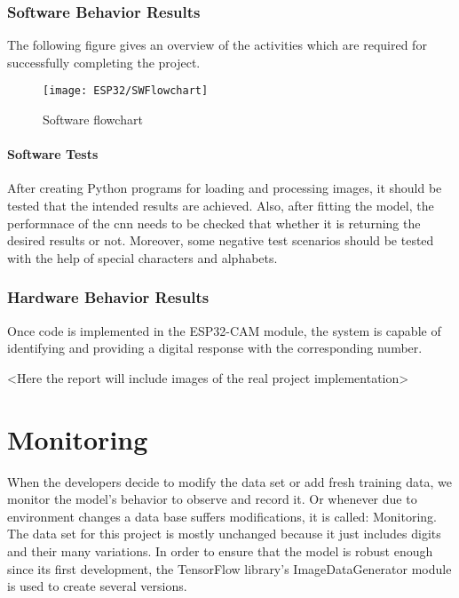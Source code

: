 \subsubsection{Software Behavior Results}

The following figure  gives an overview of the activities which are required for successfully completing the project.

\begin{figure}  
	\begin{center}
		\texttt{[image: ESP32/SWFlowchart]}
		\caption{Software flowchart} \label{fig:SWflowchart}
	\end{center}
\end{figure}

\paragraph{Software Tests}

After creating Python programs for loading and processing images, it should be tested that the intended results are achieved. Also, after fitting the model, the performnace of the \ac{cnn} needs to be checked that whether it is returning the desired results or not. Moreover, some negative test scenarios should be tested with the help of special characters and alphabets.

\subsubsection{Hardware Behavior Results}
Once code is implemented in the ESP32-CAM module, the system is capable of identifying and providing a digital response with the corresponding number. 

<Here the report will include images of the real project implementation> 


\section{Monitoring}
When the developers decide to modify the data set or add fresh training data, we monitor the model's behavior to observe and record it. Or whenever due to environment changes a data base suffers modifications, it is called: Monitoring. The data set for this project is mostly unchanged because it just includes digits and their many variations. In order to ensure that the model is robust enough since its first development, the TensorFlow library's ImageDataGenerator module is used to create several versions. 

